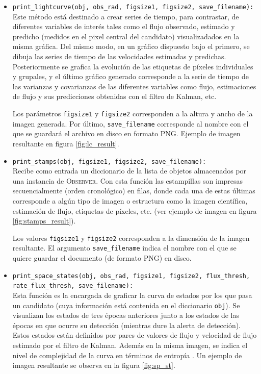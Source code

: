 \begin{itemize}
\item \texttt{print\_lightcurve(obj, obs\_rad, figsize1, figsize2, save\_filename):}\\

Este m\'etodo est\'a destinado a crear series de tiempo, para contrastar, de diferentes variables de inter\'es tales como el flujo observado, estimado y predicho (medidos en el pixel central del candidato) visualizadados en la misma gr\'afica. Del mismo modo, en un gr\'afico dispuesto bajo el primero, se dibuja las series de tiempo de las velocidades estimadas y predichas. Posteriormente se grafica la evoluci\'on de las etiquetas de p\'ixeles individuales y grupales, y el \'ultimo gr\'afico generado corresponde a la serie de tiempo de las varianzas y covarianzas de las diferentes variables como flujo, estimaciones de flujo y sus predicciones obtenidas con el filtro de Kalman, etc.
\bigskip

 Los par\'ametros \texttt{figsize1} y \texttt{figsize2} corresponden a la altura y ancho de la imagen generada. Por \'ultimo, \texttt{save\_filename} corresponde al nombre con el que se guardar\'a el archivo en disco en formato PNG. Ejemplo de imagen resultante en figura \ref{fig:lc_result}.
 
\item \texttt{print\_stamps(obj, figsize1, figsize2, save\_filename):}\\
Recibe como entrada un diccionario de la lista de objetos almacenados por una instancia de \textsc{Observer}. Con esta funci\'on las estampillas son impresas secuencialmente (orden cronol\'ogico) en filas, donde cada una de estas \'ultimas corresponde a alg\'un tipo de imagen o estructura como la imagen cient\'ifica, estimaci\'on de flujo, etiquetas de p\'ixeles, etc. (ver ejemplo de imagen en figura \ref{fig:stamps_result}).
\bigskip

Los valores \texttt{figsize1} y \texttt{figsize2} corresponden a la dimensi\'on de la imagen resultante. El argumento \texttt{save\_filename} indica el nombre con el que se quiere guardar el documento (de formato PNG) en disco. 
\item \texttt{print\_space\_states(obj, obs\_rad, figsize1, figsize2, flux\_thresh, rate\_flux\_thresh, save\_filename):}\\
Esta funci\'on es la encargada de graficar la curva de estados por los que pasa un candidato (cuya informaci\'on est\'a contenida en el diccionario \texttt{obj}). Se visualizan los estados de  tres \'epocas anteriores junto a los estados de las \'epocas en que ocurre su detecci\'on (mientras dure la alerta de detecci\'on). Estos estados est\'an definidos por pares de valores de flujo y velocidad de flujo estimado por el filtro de Kalman. Adem\'as en la misma imagen, se indica el nivel de complejidad de la curva en t\'erminos de entrop\'ia \cite{balestrino}. Un ejemplo de imagen resultante se observa en la figura \ref{fig:sp_st}.
\bigskip


\end{itemize}
